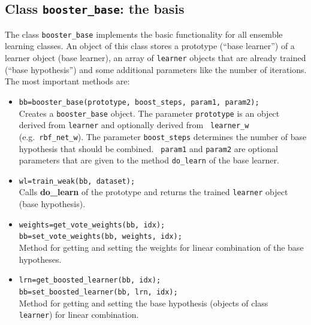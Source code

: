 \documentclass{article}
\begin{document}
\subsection{Class {\tt booster\_base}: the basis}
The class {\tt booster\_base} implements the basic functionality for all
ensemble learning classes. An object of this class stores a prototype (``base
learner'') of a learner object (base learner), an array of {\tt learner}
objects that are already trained (``base hypothesis'') and some additional
parameters like the number of iterations. The most important methods are:
\begin{itemize}
\item {\tt bb=booster\_base(prototype, boost\_steps, param1, param2);}\\
  Creates a {\tt booster\_base} object. The parameter {\tt prototype} is an
  object derived from {\tt learner} and optionally derived from {\tt
    learner\_w} (e.g.~{\tt rbf\_net\_w}). The parameter {\tt boost\_steps}
  determines the number of base hypothesis that should be combined. {\tt
    param1} and {\tt param2} are optional parameters that are given to the
  method {\tt do\_learn} of the base learner.
\item  {\tt wl=train\_weak(bb, dataset);}\\
  Calls {\bf do\_learn} of the prototype and returns the trained {\tt learner}
  object (base hypothesis).
\item {\tt weights=get\_vote\_weights(bb, idx);\\
    bb=set\_vote\_weights(bb, weights, idx);} \\
  Method for getting and setting the weights for linear combination of the
  base hypotheses.
\item {\tt lrn=get\_boosted\_learner(bb, idx);\\
    bb=set\_boosted\_learner(bb, lrn, idx);}\\
  Method for getting and setting the base hypothesis (objects of class {\tt
    learner}) for linear combination.
\end{itemize}
\end{document}

